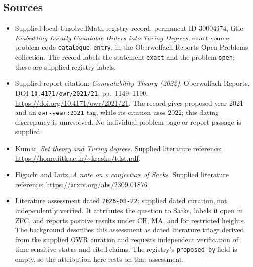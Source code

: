 \documentclass[11pt]{article}
\begin{document}
\subsection{Sources}
\begin{itemize}
\item Supplied local UnsolvedMath registry record, permanent ID \(30004674\), title \emph{Embedding Locally Countable Orders into Turing Degrees}, exact source problem code \texttt{catalogue entry}, in the Oberwolfach Reports Open Problems collection. The record labels the statement \texttt{exact} and the problem \texttt{open}; these are supplied registry labels.
\item Supplied report citation: \emph{Computability Theory (2022)}, Oberwolfach Reports, DOI \texttt{10.4171/owr/2021/21}, pp.~1149--1190. \url{https://doi.org/10.4171/owr/2021/21}. The record gives proposed year 2021 and an \texttt{owr-year:2021} tag, while its citation uses 2022; this dating discrepancy is unresolved. No individual problem page or report passage is supplied.
\item Kumar, \emph{Set theory and Turing degrees}. Supplied literature reference: \url{https://home.iitk.ac.in/~krashu/tdst.pdf}.
\item Higuchi and Lutz, \emph{A note on a conjecture of Sacks}. Supplied literature reference: \url{https://arxiv.org/abs/2309.01876}.
\item Literature assessment dated \texttt{2026-08-22}: supplied dated curation, not independently verified. It attributes the question to Sacks, labels it open in ZFC, and reports positive results under CH, MA, and for restricted heights. The background describes this assessment as dated literature triage derived from the supplied OWR curation and requests independent verification of time-sensitive status and cited claims. The registry's \texttt{proposed\_by} field is empty, so the attribution here rests on that assessment.
\end{itemize}
\end{document}
